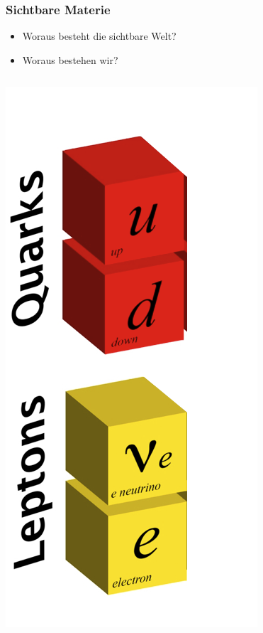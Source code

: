 \documentclass{beamer}
\begin{document}
\begin{frame}[t]
  \frametitle{Sichtbare Materie}
  \begin{itemize}
  \item Woraus besteht die sichtbare Welt?
  \item Woraus bestehen wir?
  \end{itemize}
  \vskip0.3cm
  \begin{columns}
    \begin{column}{0.25\textwidth}
      \centering
      \includegraphics[width=\textwidth]{sm/StandardModel_FirstGeneration.png}

\end{column}
\end{columns}
\end{frame}
\end{document}
